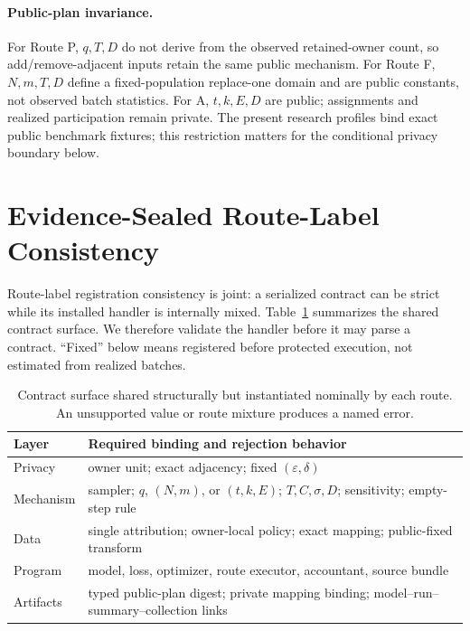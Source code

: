\documentclass[letterpaper]{article}
\begin{document}
\paragraph{Public-plan invariance.}
For Route P, $q,T,D$ do not derive from the observed retained-owner count, so
add/remove-adjacent inputs retain the same public mechanism.  For Route F,
$N,m,T,D$ define a fixed-population replace-one domain and are public constants,
not observed batch statistics.  For A, $t,k,E,D$ are public;
assignments and realized participation remain private.  The present research
profiles bind exact public benchmark fixtures; this restriction matters for
the conditional privacy boundary below.

\section{Evidence-Sealed Route-Label Consistency}

Route-label registration consistency is joint: a serialized contract can be
strict while its installed handler is internally mixed.
Table~\ref{tab:contract-surface} summarizes the shared contract surface.  We
therefore validate the handler before it may parse a contract.  ``Fixed'' below
means registered before protected execution, not estimated from realized
batches.

\begin{table}[t]
\centering
\small
\setlength{\tabcolsep}{3pt}
\begin{tabular}{@{}p{}p{}@{}}
\toprule
Layer & Required binding and rejection behavior \\
\midrule
Privacy & owner unit; exact adjacency; fixed $(\varepsilon,\delta)$ \\
Mechanism & sampler; $q$, $(N,m)$, or $(t,k,E)$; $T,C,\sigma,D$; sensitivity; empty-step rule \\
Data & single attribution; owner-local policy; exact mapping; public-fixed transform \\
Program & model, loss, optimizer, route executor, accountant, source bundle \\
Artifacts & typed public-plan digest; private mapping binding; model--run--summary--collection links \\
\bottomrule
\end{tabular}
\caption{Contract surface shared structurally but instantiated nominally by
each route.  An unsupported value or route mixture produces a named error.}
\label{tab:contract-surface}
\end{table}
\end{document}
